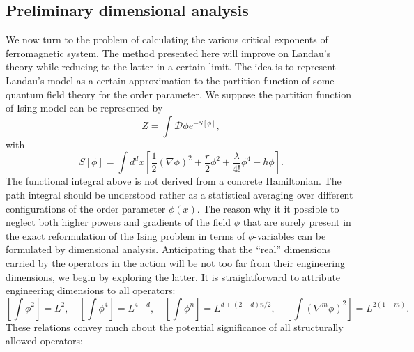 \subsection{Preliminary dimensional analysis}
We now turn to the problem of calculating the various critical exponents of ferromagnetic system. The method presented here will improve on Landau's theory while reducing to the latter in a certain limit. The idea is to represent Landau's model as a certain approximation to the partition function of some quantum field theory for the order parameter. 
We suppose the partition function of Ising model can be represented by
\[Z = \int \mathcal{D}\phi e^{-S[\phi]},\]
with 
\[S[\phi] = \int d^d x \left[\frac{1}{2}(\nabla \phi)^2 + \frac{r}{2}\phi^2 + \frac{\lambda}{4!}\phi^4 - h\phi \right].\]
The functional integral above is not derived from a concrete Hamiltonian. The path integral should be understood rather as a statistical averaging over different configurations of the order parameter $\phi(x)$. 
The reason why it it possible to neglect both higher powers and gradients of the field $\phi$ that are surely present in the exact reformulation of the Ising problem in terms of $\phi$-variables can be formulated by dimensional analysis.
Anticipating that the ``real'' dimensions carried by the operators in the action will be not too far from their
engineering dimensions, we begin by exploring the latter. 
It is straightforward to attribute engineering dimensions to all operators:
\[\left[\int \phi^2 \right] = L^{2} , \quad \left[\int \phi^4 \right] = L^{4-d} , \quad \left[\int \phi^{n} \right] = L^{d + (2-d)n/2}, \quad  \left[\int (\nabla^m \phi)^2 \right] = L^{2(1-m)}.\]
These relations convey much about the potential significance of all structurally allowed operators:
